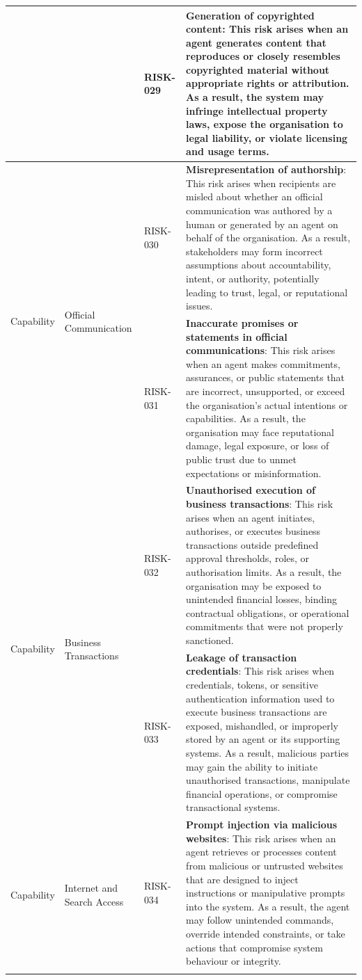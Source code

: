 \documentclass{article}
\begin{document}
\begin{longtable}{|p{}|p{}|p{}|p{}|}
& & RISK-029 & \textbf{Generation of copyrighted content}: This risk arises when an agent generates content that reproduces or closely resembles copyrighted material without appropriate rights or attribution. As a result, the system may infringe intellectual property laws, expose the organisation to legal liability, or violate licensing and usage terms. \\ \hline
\multirow{2}{=}{Capability}
& \multirow{2}{=}{Official Communication}
& RISK-030 & \textbf{Misrepresentation of authorship}: This risk arises when recipients are misled about whether an official communication was authored by a human or generated by an agent on behalf of the organisation. As a result, stakeholders may form incorrect assumptions about accountability, intent, or authority, potentially leading to trust, legal, or reputational issues. \\ \cline{3-4}
& & RISK-031 & \textbf{Inaccurate promises or statements in official communications}: This risk arises when an agent makes commitments, assurances, or public statements that are incorrect, unsupported, or exceed the organisation's actual intentions or capabilities. As a result, the organisation may face reputational damage, legal exposure, or loss of public trust due to unmet expectations or misinformation. \\ \hline
\multirow{2}{=}{Capability}
& \multirow{2}{=}{Business Transactions}
& RISK-032 & \textbf{Unauthorised execution of business transactions}: This risk arises when an agent initiates, authorises, or executes business transactions outside predefined approval thresholds, roles, or authorisation limits. As a result, the organisation may be exposed to unintended financial losses, binding contractual obligations, or operational commitments that were not properly sanctioned. \\ \cline{3-4}
& & RISK-033 & \textbf{Leakage of transaction credentials}: This risk arises when credentials, tokens, or sensitive authentication information used to execute business transactions are exposed, mishandled, or improperly stored by an agent or its supporting systems. As a result, malicious parties may gain the ability to initiate unauthorised transactions, manipulate financial operations, or compromise transactional systems. \\ \hline
\multirow{2}{=}{Capability}
& \multirow{2}{=}{Internet and Search Access}
& RISK-034 & \textbf{Prompt injection via malicious websites}: This risk arises when an agent retrieves or processes content from malicious or untrusted websites that are designed to inject instructions or manipulative prompts into the system. As a result, the agent may follow unintended commands, override intended constraints, or take actions that compromise system behaviour or integrity. \\ \cline{3-4}

\end{longtable}
\end{document}
